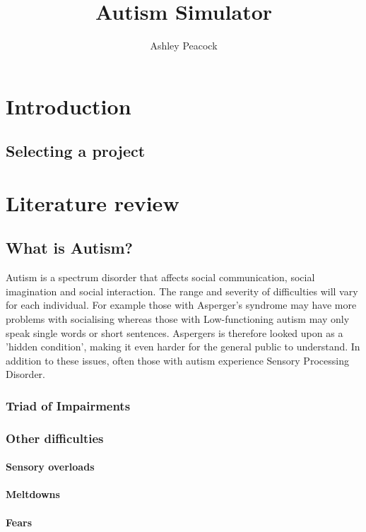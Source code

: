 \documentclass[11pt]{report}
\begin{document}
\title{Autism Simulator}
\author{Ashley Peacock}
\maketitle
\tableofcontents
\chapter{Introduction}

\section{Selecting a project}


\chapter{Literature review}
\section{What is Autism?}
Autism is a spectrum disorder that affects social communication, social imagination and social interaction. The range and severity of difficulties will vary for each individual. For example those with Asperger's syndrome may have more problems with socialising whereas those with Low-functioning autism may only speak single words or short sentences. Aspergers is therefore looked upon as a 'hidden condition', making it even harder for the general public to understand. 
In addition to these issues, often those with autism experience Sensory Processing Disorder. 
\subsection{Triad of Impairments}

\subsection{Other difficulties}
\subsubsection{Sensory overloads}
\subsubsection{Meltdowns}
\subsubsection{Fears}
\end{document}
